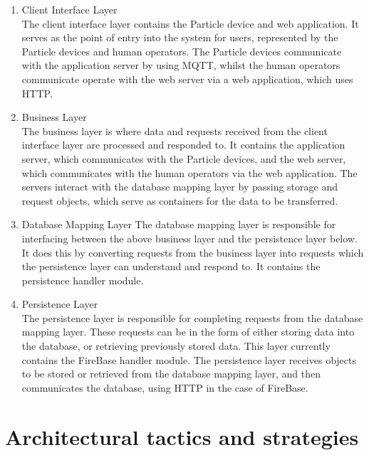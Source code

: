 \documentclass{article}
\begin{document}
	\begin{enumerate}
		\item Client Interface Layer\\
		The client interface layer contains the Particle device and web 
		application. It serves as the point of entry into the system for 
		users, represented by the Particle devices and human operators. 
		The Particle devices communicate with the application server by 
		using MQTT, whilst the human operators communicate operate with 
		the web server via a web application, which uses HTTP.
		\item Business Layer\\
		The business layer is where data and requests received from the 
		client interface layer are processed and responded to. It 
		contains the application server, which communicates with the 
		Particle devices, and the web server, which communicates with the 
		human operators via the web application. The servers interact 
		with the database mapping layer by passing storage and request 
		objects, which serve as containers for the data to be transferred.
		\item Database Mapping Layer
		The database mapping layer is responsible for interfacing between 
		the above business layer and the persistence layer below. It does 
		this by converting requests from the business layer into requests 
		which the persistence layer can understand and respond to. It 
		contains the persistence handler module.
		\item Persistence Layer\\
		The persistence layer is responsible for completing requests from 
		the database mapping layer. These requests can be in the form of 
		either storing data into the database, or retrieving previously 
		stored data. This layer currently contains the FireBase handler 
		module. The persistence layer receives objects to be stored or 
		retrieved from the database mapping layer, and then communicates 
		the database, using HTTP in the case of FireBase.
	\end{enumerate}

\newpage

\section{Architectural tactics and strategies}

\newpage

\end{document}
